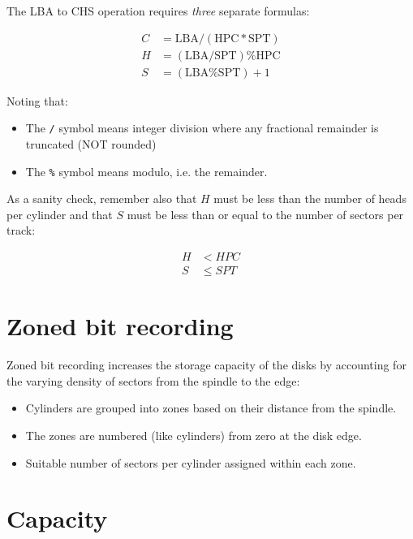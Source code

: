 The LBA to CHS operation requires \textit{three} separate formulas:

\begin{align}
  C & = \mbox{LBA} / ( \mbox{HPC} * \mbox{SPT} ) \label{eq:lba-to-c} \\
  H & = ( \mbox{LBA} / \mbox{SPT} ) \% \mbox{HPC}  \label{eq:lba-to-h} \\
  S & = ( \mbox{LBA} \% \mbox{SPT} ) + 1 \label{eq:lba-to-s}
\end{align}

Noting that:

\begin{itemize}
\item
  The \texttt{/} symbol means integer division where any fractional
  remainder is truncated (NOT rounded)
\item
  The \texttt{\%} symbol means modulo, i.e. the remainder.
\end{itemize}

As a sanity check, remember also that $H$ must be less than the number of
heads per cylinder and that $S$ must be less than or equal to the number
of sectors per track:

\begin{align}
  H & < HPC \label{eq:h-lt-hpc} \\
  S & \le SPT \label{eq:s-le-spt}
\end{align}

\section{Zoned bit recording}
\label{sec:zoned-bit-recording}


Zoned bit recording increases the storage capacity of the disks by
accounting for the varying density of sectors from the spindle to the
edge:

\begin{itemize}
\item
  Cylinders are grouped into zones based on their distance from the
  spindle.
\item
  The zones are numbered (like cylinders) from zero at the disk edge.
\item
  Suitable number of sectors per cylinder assigned within each zone.
\end{itemize}

\section{Capacity}
\label{sec:magnetic-disk-capacity}

